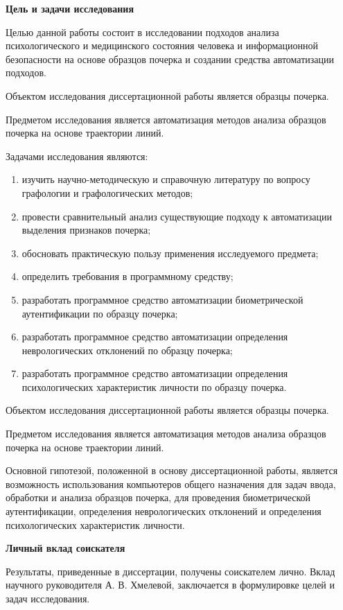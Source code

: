 
\textbf{Цель и задачи исследования}
\bigskip

Целью данной работы состоит в исследовании подходов анализа психологического и медицинского состояния человека и информационной безопасности на основе образцов почерка и создании средства автоматизации подходов.

Объектом исследования диссертационной работы является образцы почерка.

Предметом исследования является автоматизация методов анализа образцов почерка на основе траектории линий.

Задачами исследования являются:
\begin{enumerate}
  \item изучить научно-методическую и справочную литературу по вопросу графологии и графологических методов;
  \item провести сравнительный анализ существующие подходу к автоматизации выделения признаков почерка;
  \item обосновать практическую пользу применения исследуемого \mbox{предмета};
  \item определить требования в программному средству;
  \item разработать программное средство автоматизации биометрической аутентификации по образцу почерка;
  \item разработать программное средство автоматизации определения неврологических отклонений по образцу почерка;
  \item разработать программное средство автоматизации определения психологических характеристик личности по образцу почерка.
\end{enumerate}

Объектом исследования диссертационной работы является образцы почерка.

Предметом исследования является автоматизация методов анализа образцов почерка на основе траектории линий.

Основной гипотезой, положенной в основу диссертационной работы, является возможность использования компьютеров общего назначения для задач ввода, обработки и анализа образцов почерка, для проведения биометрической аутентификации, определения неврологических отклонений и определения психологических характеристик личности. 

\bigskip
\textbf{Личный вклад соискателя}
\bigskip

Результаты, приведенные в диссертации, получены  соискателем лично. Вклад научного руководителя А. В. Хмелевой, заключается в формулировке целей и задач исследования.

